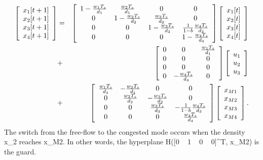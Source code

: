 \documentclass[letterpaper,10pt,english]{sphinxmanual}
\begin{document}
\begin{gather}
\begin{split}\begin{aligned}
\left[\begin{array}{c}
x_1[t+1]\\
x_2[t+1]\\
x_3[t+1]\\
x_4[t+1]\end{array}\right] & = & \left[\begin{array}{cccc}
1-\frac{w_1T_s}{d_1} & \frac{w_2T_s}{d_1} & 0 & 0\\
0 & 1-\frac{w_2T_s}{d_2} & \frac{w_3T_s}{d_2} & 0\\
0 & 0 & 1-\frac{w_3T_s}{d_3} & \frac{1}{1-b}\frac{w_4T_s}{d_3}\\
0 & 0 & 0 & 1-\frac{w_4T_s}{d_4}\end{array}\right]
\left[\begin{array}{c}
x_1[t]\\
x_2[t]\\
x_3[t]\\
x_4[t]\end{array}\right] \nonumber\\
& + & \left[\begin{array}{ccc}
0 & 0 & \frac{w_1T_s}{d_1}\\
0 & 0 & 0\\
0 & 0 & 0\\
0 & -\frac{w_4T_s}{d_4} & 0\end{array}\right]\left[\begin{array}{c}
u_1\\
u_2\\
u_3\end{array}\right] \nonumber\\
& + & \left[\begin{array}{cccc}
\frac{w_1T_s}{d_1} & -\frac{w_2T_s}{d_1} & 0 & 0\\
0 & \frac{w_2T_s}{d_2} & -\frac{w_3T_s}{d_2} & 0\\
0 & 0 & \frac{w_3T_s}{d_3} & -\frac{1}{1-b}\frac{w_4T_s}{d_3}\\
0 & 0 & 0 & \frac{w_4T_s}{d_4}\end{array}\right]
\left[\begin{array}{c}
x_{M1}\\
x_{M2}\\
x_{M3}\\
x_{M4}\end{array}\right]. \label{cflow}\end{aligned}\end{split}\notag
\end{gather}
The switch from the free-flow to the congested mode occurs when the
density x_2 reaches x_{M2}. In other words, the
hyperplane H([0 ~ 1 ~ 0 ~ 0]^T, x_{M2}) is the guard.
\end{document}

